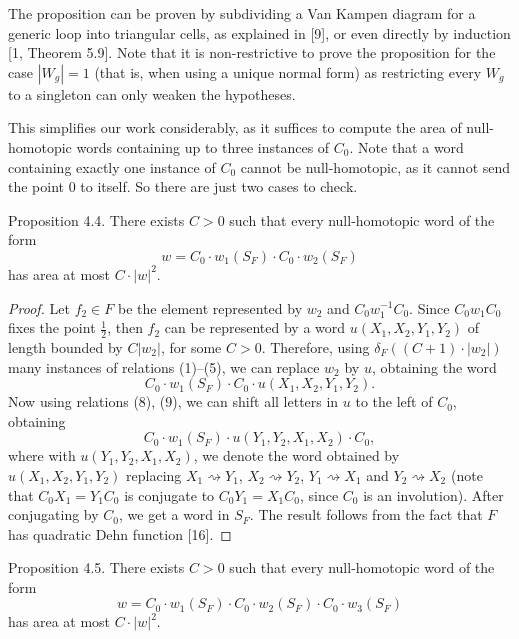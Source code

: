 The proposition can be proven by subdividing a Van Kampen diagram for a generic loop into triangular cells, as explained in [9], or even directly by induction [1, Theorem 5.9]. Note that it is non-restrictive to prove the proposition for the case $|W_g|=1$ (that is, when using a unique normal form) as restricting every $W_g$ to a singleton can only weaken the hypotheses.

This simplifies our work considerably, as it suffices to compute the area of null-homotopic words containing up to three instances of $C_0$. Note that a word containing exactly one instance of $C_0$ cannot be null-homotopic, as it cannot send the point $0$ to itself. So there are just two cases to check.
\begin{authorstatement}{Proposition 4.4.}
There exists $C>0$ such that every null-homotopic word of the form
\[
w=C_0\cdot w_1(S_F)\cdot C_0\cdot w_2(S_F)
\]
has area at most $C\cdot|w|^2$.
\end{authorstatement}
\begin{proof}
Let $f_2\in F$ be the element represented by $w_2$ and $C_0w_1^{-1}C_0$. Since $C_0w_1C_0$ fixes the point $\frac12$, then $f_2$ can be represented by a word $u(X_1,X_2,Y_1,Y_2)$ of length bounded by $C|w_2|$, for some $C>0$. Therefore, using $\delta_F((C+1)\cdot|w_2|)$ many instances of relations (1)--(5), we can replace $w_2$ by $u$, obtaining the word
\[
C_0\cdot w_1(S_F)\cdot C_0\cdot u(X_1,X_2,Y_1,Y_2).
\]
\noindent Now using relations (8), (9), we can shift all letters in $u$ to the left of $C_0$, obtaining
\[
C_0\cdot w_1(S_F)\cdot u(Y_1,Y_2,X_1,X_2)\cdot C_0,
\]
where with $u(Y_1,Y_2,X_1,X_2)$, we denote the word obtained by $u(X_1,X_2,Y_1,Y_2)$ replacing $X_1\rightsquigarrow Y_1$, $X_2\rightsquigarrow Y_2$, $Y_1\rightsquigarrow X_1$ and $Y_2\rightsquigarrow X_2$ (note that $C_0X_1=Y_1C_0$ is conjugate to $C_0Y_1=X_1C_0$, since $C_0$ is an involution). After conjugating by $C_0$, we get a word in $S_F$. The result follows from the fact that $F$ has quadratic Dehn function [16].
\end{proof}
\begin{authorstatement}{Proposition 4.5.}
There exists $C>0$ such that every null-homotopic word of the form
\[
w=C_0\cdot w_1(S_F)\cdot C_0\cdot w_2(S_F)\cdot C_0\cdot w_3(S_F)
\]
has area at most $C\cdot|w|^2$.
\end{authorstatement}
